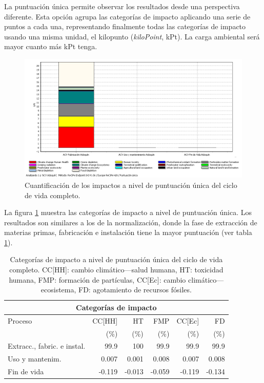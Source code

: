 La puntuación única permite observar los resultados desde una perspectiva diferente. Esta opción agrupa las categorías de impacto aplicando una serie de puntos a cada una, representando finalmente todas las categorías de impacto usando una misma unidad, el kilopunto (\textit{kiloPoint}, kPt). La carga ambiental será mayor cuanto más kPt tenga.

\begin{figure}[!htb]
\centering
\includegraphics[width=15cm]{img/completo_puntuacionunica.png}
\caption{Cuantificación de los impactos a nivel de puntuación única del ciclo de vida completo.}
\label{fig:completo_puntuacionunica}
\end{figure}

La figura \ref{fig:completo_puntuacionunica} muestra las categorías de impacto a nivel de puntuación única. Los resultados son similares a los de la normalización, donde la fase de extracción de materias primas, fabricación e instalación tiene la mayor puntuación (ver tabla \ref{categoriasimpactocompletopuntunica}).

\begin{table}[!htb]
\centering
\begin{tabular}{p{4cm}rrrrr}
\toprule
\multicolumn{6}{c}{Categorías de impacto}\\
\midrule
Proceso & CC[HH] & HT & FMP & CC[Ec] & FD\\
 &  (\%) & (\%) & (\%) & (\%) & (\%)\\
\midrule
Extracc., fabric. e instal. & 99.9 & 100 & 99.9 & 99.9 & 99.9\\
Uso y mantenim. & 0.007 & 0.001 & 0.008 & 0.007 & 0.008\\
Fin de vida & -0.119 & -0.013 & -0.059 & -0.119 & -0.134\\
\bottomrule
\end{tabular}
\caption[Categorías de impacto a nivel de puntuación única del ciclo de vida completo.]{Categorías de impacto a nivel de puntuación única del ciclo de vida completo. CC[HH]: cambio climático—salud humana, HT: toxicidad humana, FMP: formación de partículas, CC[Ec]: cambio climático—ecosistema, FD: agotamiento de recursos fósiles.}
\label{categoriasimpactocompletopuntunica}
\end{table}

